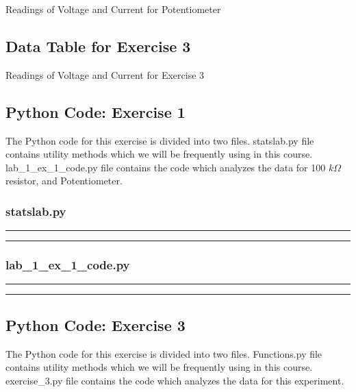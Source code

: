 \documentclass[letterpaper,12pt]{article}
\begin{document}
\begin{table}[H]
  \centering
  \caption{Readings of Voltage and Current for Potentiometer}
  \label{potentiometerdata}
\end{table}

\subsection{Data Table for Exercise 3}
\begin{table}[H]
  \centering
  \caption{Readings of Voltage and Current for Exercise 3}
  \label{ex3data}
\end{table}

\pagebreak

\subsection{Python Code: Exercise 1}

The Python code for this exercise is divided into two files. statslab.py file contains utility methods
which we will be frequently using in this course. lab\_1\_ex\_1\_code.py file contains the code which analyzes
the data for 100 $k\Omega$ resistor, and Potentiometer.

\subsubsection{statslab.py}
\noindent\rule{\textwidth}{1pt}

\noindent\rule{\textwidth}{1pt}

\pagebreak

\subsubsection{lab\_1\_ex\_1\_code.py}
\noindent\rule{\textwidth}{1pt}

\noindent\rule{\textwidth}{1pt}

\pagebreak

\subsection{Python Code: Exercise 3}

The Python code for this exercise is divided into two files. Functions.py file contains utility methods
which we will be frequently using in this course. exercise\_3.py file contains the code which analyzes
the data for this experiment.
\end{document}
